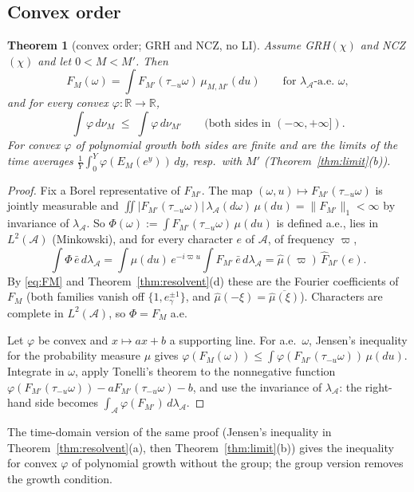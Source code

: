 \documentclass[11pt]{amsart}
\newtheorem{theorem}{Theorem}[section]
\theoremstyle{definition}
\numberwithin{equation}{section}
\newcommand{\cA}{\mathcal A}          %
\newcommand{\hA}{\lambda_{\cA}}       %
\begin{document}
\subsection{Convex order}

\begin{theorem}[convex order; GRH and NCZ, no LI]\label{thm:cx}
Assume GRH$(\chi)$ and NCZ$(\chi)$ and let $0<M<M'$. Then
\[
F_M(\omega)=\int F_{M'}(\tau_{-u}\omega)\,\mu_{M,M'}(du)
\qquad\text{for }\hA\text{-a.e.\ }\omega,
\]
and for \emph{every} convex $\varphi:\mathbb R\to\mathbb R$,
\[
\int\varphi\,d\nu_M\;\le\;\int\varphi\,d\nu_{M'}
\qquad(\text{both sides in }(-\infty,+\infty]).
\]
For convex $\varphi$ of polynomial growth both sides are finite and
are the limits of the time averages
$\frac1Y\int_0^Y\varphi(E_M(e^y))\,dy$, resp.\ with $M'$
(Theorem~\ref{thm:limit}(b)).
\end{theorem}

\begin{proof}
Fix a Borel representative of $F_{M'}$. The map
$(\omega,u)\mapsto F_{M'}(\tau_{-u}\omega)$ is jointly measurable and
$\iint|F_{M'}(\tau_{-u}\omega)|\,\hA(d\omega)\,\mu(du)=\|F_{M'}\|_1
<\infty$ by invariance of $\hA$. So
$\Phi(\omega):=\int F_{M'}(\tau_{-u}\omega)\,\mu(du)$ is defined
a.e., lies in $L^2(\cA)$ (Minkowski), and for every character $e$ of
$\cA$, of frequency $\varpi$,
\[
\int\Phi\,\bar e\,d\hA=\int\mu(du)\,e^{-i\varpi u}\int F_{M'}\,\bar e\,d\hA
=\hat\mu(\varpi)\,\hat F_{M'}(e).
\]
By \eqref{eq:FM} and Theorem~\ref{thm:resolvent}(d) these are the
Fourier coefficients of $F_M$ (both families vanish off
$\{1,e_\gamma^{\pm1}\}$, and $\hat\mu(-\xi)=\overline{\hat\mu(\xi)}$).
Characters are complete in $L^2(\cA)$, so $\Phi=F_M$ a.e.

Let $\varphi$ be convex and $x\mapsto ax+b$ a supporting line. For
a.e.\ $\omega$, Jensen's inequality for the probability measure
$\mu$ gives
$\varphi(F_M(\omega))\le\int\varphi(F_{M'}(\tau_{-u}\omega))\,\mu(du)$.
Integrate in $\omega$, apply Tonelli's theorem to the nonnegative
function $\varphi(F_{M'}(\tau_{-u}\omega))-aF_{M'}(\tau_{-u}\omega)-b$,
and use the invariance of $\hA$: the right-hand side becomes
$\int_{\cA}\varphi(F_{M'})\,d\hA$.
\end{proof}

The time-domain version of the same proof (Jensen's inequality in
Theorem~\ref{thm:resolvent}(a), then Theorem~\ref{thm:limit}(b))
gives the inequality for convex $\varphi$ of polynomial growth
without the group; the group version removes the growth condition.
\end{document}
